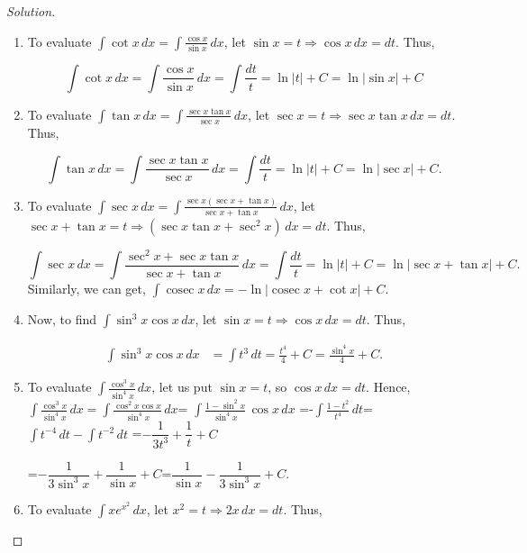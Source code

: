 \documentclass{book}
\DeclareMathOperator{\cosec}{cosec}
\theoremstyle{definition}
\newenvironment{solution}
    {\begin{proof}[Solution]}
    {\end{proof}}
\begin{document}
\begin{solution}
\begin{enumerate}[label=(\roman*)]
Similarly, we can get, $\displaystyle\int\frac{dx}{1+(ax+b)^2}=\frac{1}{a}\tan^{-1}(ax+b)+C$.

\item To evaluate $\displaystyle\int\cot x \, dx=\displaystyle\int\frac{\cos x}{\sin x} \, dx$, let $\sin x=t \Rightarrow \cos x \, dx=dt$. Thus,

\[
\int\cot x \, dx = \int\frac{\cos x}{\sin x} \, dx=\int\frac{dt}{t} = \ln |t|+C=\ln |\sin x|+C
\]

\item To evaluate $\displaystyle\int\tan x \, dx=\displaystyle\int\frac{\sec x\tan x}{\sec x} \, dx$, let $\sec x=t \Rightarrow \sec x\tan x \, dx=dt$. Thus,

\[
\int\tan x \, dx = \int\frac{\sec x\tan x}{\sec x} \, dx=\int\frac{dt}{t} = \ln |t|+C=\ln |\sec x|+C.
\]

\item To evaluate $\displaystyle\int\sec x \, dx=\displaystyle\int\frac{\sec x(\sec x+\tan x)}{\sec x+\tan x} \, dx$, let $\sec x+\tan x=t \Rightarrow (\sec x\tan x+\sec^2x) \, dx=dt$. Thus,

\[
\int\sec x \, dx = \int\frac{\sec^2 x+\sec x\tan x}{\sec x+\tan x} \, dx=\int\frac{dt}{t} = \ln |t|+C=\ln |\sec x+\tan x|+C.
\]
Similarly, we can get, $\displaystyle\int\cosec x \, dx=-\ln |\cosec x+\cot x|+C$.

\item Now, to find $\displaystyle\int\sin^3 x\cos x \, dx$, let $\sin x=t \Rightarrow \cos x \, dx=dt$. Thus,

\begin{align*}
\int\sin^3 x\cos x  \, dx &=\int t^3 \, dt= \frac{t^4}{4}+C=\frac{\sin^4 x}{4}+C.    
\end{align*}


\item To evaluate $\displaystyle\int\frac{\cos^3x}{\sin^4x}\,dx$, let us put $\sin x=t$, so $\cos x\,dx=dt$. Hence,
$\displaystyle\int\frac{\cos^3x}{\sin^4x}\,dx=\int\frac{\cos^2x\cos x}{\sin^4x}\,dx$= $\displaystyle\int\frac{1-\sin^2 x}{\sin^4x}\,\cos x\,dx$
=-$\displaystyle\int \frac{1-t^2}{t^4}\,dt$=$\int t^{-4} \,dt-\int t^{-2}\,dt$
=$-\dfrac{1}{3t^3}+\dfrac{1}{t}+C$

=$-\dfrac{1}{3\sin^3x}+\dfrac{1}{\sin x}+C$=$\dfrac{1}{\sin x}-\dfrac{1}{3\sin^3x}+C$.


\item To evaluate $\displaystyle\int xe^{x^2} \, dx$, let $x^2=t \Rightarrow 2x \, dx=dt$. Thus,


\end{enumerate}
\end{solution}
\end{document}
